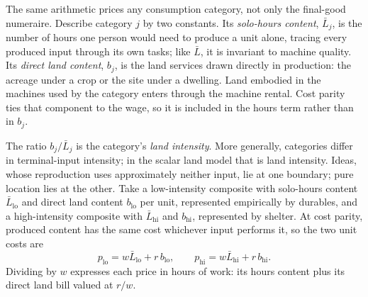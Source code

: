 \documentclass[12pt]{article}
\theoremstyle{plain}
\newcommand{\lo}{\mathrm{lo}}
\newcommand{\hi}{\mathrm{hi}}
\begin{document}
The same arithmetic prices any consumption category, not only the final-good numeraire. Describe category $j$ by two constants. Its \emph{solo-hours content}, $\bar{L}_j$, is the number of hours one person would need to produce a unit alone, tracing every produced input through its own tasks; like $\bar{L}$, it is invariant to machine quality. Its \emph{direct land content}, $b_j$, is the land services drawn directly in production: the acreage under a crop or the site under a dwelling. Land embodied in the machines used by the category enters through the machine rental. Cost parity ties that component to the wage, so it is included in the hours term rather than in $b_j$.

The ratio $b_j/\bar{L}_j$ is the category's \emph{land intensity}. More generally, categories differ in terminal-input intensity; in the scalar land model that is land intensity. Ideas, whose reproduction uses approximately neither input, lie at one boundary; pure location lies at the other. Take a low-intensity composite with solo-hours content $\bar{L}_{\lo}$ and direct land content $b_{\lo}$ per unit, represented empirically by durables, and a high-intensity composite with $\bar{L}_{\hi}$ and $b_{\hi}$, represented by shelter. At cost parity, produced content has the same cost whichever input performs it, so the two unit costs are
\begin{equation}\label{eq:composites}
p_{\lo} = w\bar{L}_{\lo} + r\, b_{\lo},
\qquad
p_{\hi} = w\bar{L}_{\hi} + r\, b_{\hi}.
\end{equation}
Dividing by $w$ expresses each price in hours of work: its hours content plus its direct land bill valued at $r/w$.
\end{document}
